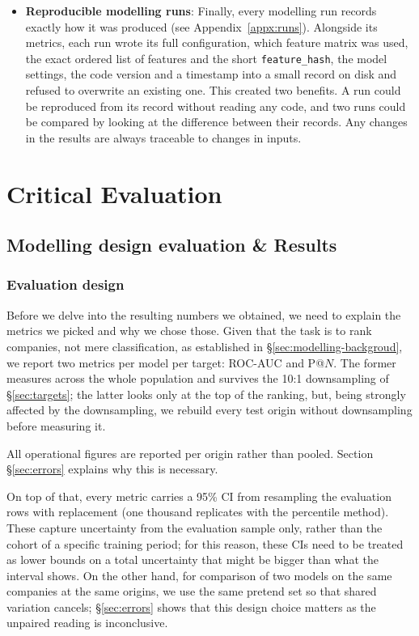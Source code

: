 \documentclass[    author={Samuel Menon Demelo; Sneha Saphala Ram Prasad; 
Viktor Ander Lindholm; Vishal Khatri},
               supervisor={Prof. Fernando Moreno-Pino},
                   degree={MSc},
                    title={Lloyds Commercial Banking Intelligence},
                 subtitle={Ranking SME Lending, Risk and Growth Prospects for Lloyds Banking Group},
                     type={},
                     year={2026}]{dissertation}
\begin{document}
\begin{itemize}
    \item \textbf{Reproducible modelling runs}: Finally, every modelling run records exactly how it was produced (see Appendix~\ref{appx:runs}). Alongside its metrics, each run wrote its full configuration, which feature matrix was used, the exact ordered list of features and the short \texttt{feature\_hash}, the model settings, the code version and a timestamp into a small record on disk and refused to overwrite an existing one. This created two benefits. A run could be reproduced from its record without reading any code, and two runs could be compared by looking at the difference between their records. Any changes in the results are always traceable to changes in inputs.
\end{itemize}




\chapter{Critical Evaluation}
\label{chap:evaluation}

\section{Modelling design evaluation \& Results}

\subsection{Evaluation design}
\label{sec:evaldesign}
Before we delve into the resulting numbers we obtained, we need to explain the metrics we picked and why we chose those. Given that the task is to rank companies, not mere classification, as established in \S\ref{sec:modelling-backgroud}, we report two metrics per model per target: ROC-AUC and P@$N$. The former measures across the whole population and survives the 10:1 downsampling of \S\ref{sec:targets}; the latter looks only at the top of the ranking, but, being strongly affected by the downsampling, we rebuild every test origin without downsampling before measuring it.

All operational figures are reported per origin rather than pooled. Section \S\ref{sec:errors} explains why this is necessary.

On top of that, every metric carries a 95\% CI from resampling the evaluation rows with replacement (one thousand replicates with the percentile method). These capture uncertainty from the evaluation sample only, rather than the cohort of a specific training period; for this reason, these CIs need to be treated as lower bounds on a total uncertainty that might be bigger than what the interval shows. On the other hand, for comparison of two models on the same companies at the same origins, we use the same pretend set so that shared variation cancels; \S\ref{sec:errors} shows that this design choice matters as the unpaired reading is inconclusive.
\end{document}
